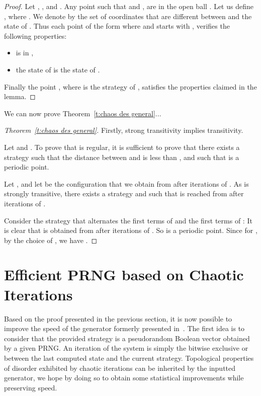 \documentclass{article}
\begin{document}
\begin{proof}
 Let , , and . 
Any point  such that  and , 
are in the open ball . Let us define 
, where .
We denote by  the set of coordinates
that are different between  and the state of . Thus each point  of
the form  where  and  starts with 
, verifies the following properties:
\begin{itemize}
 \item  is in ,
 \item the state of  is the state of .
\end{itemize}
Finally the point , 
where  is the strategy of , satisfies the properties
claimed in the lemma.
\end{proof}

We can now prove Theorem~\ref{t:chaos des general}...

\begin{proof}[Theorem~\ref{t:chaos des general}]
Firstly, strong transitivity implies transitivity.

Let  and . To
prove that  is regular, it is sufficient to prove that
there exists a strategy  such that the distance between
 and  is less than , and such that
 is a periodic point.

Let , and let  be the
configuration that we obtain from  after  iterations of
. As  is strongly transitive, there exists a strategy  
and  such
that  is reached from  after  iterations of .

Consider the strategy  that alternates the first  terms
of  and the first  terms of :  It
is clear that  is obtained from  after
 iterations of . So  is a periodic
point. Since  for , by the choice of , we
have .
\end{proof}



\section{Efficient PRNG based on Chaotic Iterations}
\label{sec:efficient PRNG}

Based on the proof presented in the previous section, it is now possible to 
improve the speed of the generator formerly presented in~\cite{bgw09:ip,guyeux10}. 
The first idea is to consider
that the provided strategy is a pseudorandom Boolean vector obtained by a
given PRNG.
An iteration of the system is simply the bitwise exclusive or between
the last computed state and the current strategy.
Topological properties of disorder exhibited by chaotic 
iterations can be inherited by the inputted generator, we hope by doing so to 
obtain some statistical improvements while preserving speed.
\end{document}
